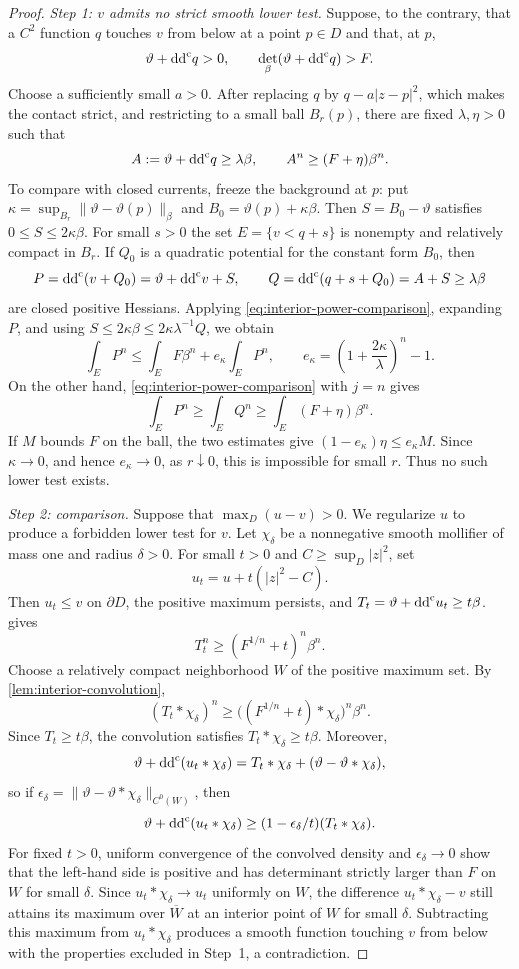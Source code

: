 \begin{proof}
\emph{Step 1: $v$ admits no strict smooth lower test.} Suppose, to the contrary, that a $C^2$ function $q$ touches $v$ from below at a point $p\in D$ and that, at $p$,
\[
  \vartheta+\mathrm{dd}^{\mathrm{c}} q>0,
  \qquad
  \det_\beta(\vartheta+\mathrm{dd}^{\mathrm{c}} q)>F.
\]
Choose a sufficiently small $a>0$. After replacing $q$ by $q-a|z-p|^2$, which makes the contact strict, and restricting to a small ball $B_r(p)$, there are fixed $\lambda,\eta>0$ such that
\[
  A:=\vartheta+\mathrm{dd}^{\mathrm{c}} q\geq\lambda\beta,
  \qquad A^n\geq(F+\eta)\beta^n.
\]
To compare with closed currents, freeze the background at $p$: put $\kappa=\sup_{B_r}\lVert\vartheta-\vartheta(p)\rVert_\beta$ and $B_0=\vartheta(p)+\kappa\beta$. Then $S=B_0-\vartheta$ satisfies $0\leq S\leq2\kappa\beta$. For small $s>0$ the set $E=\{v<q+s\}$ is nonempty and relatively compact in $B_r$. If $Q_0$ is a quadratic potential for the constant form $B_0$, then
\[
  P=\mathrm{dd}^{\mathrm{c}}(v+Q_0)=\vartheta+\mathrm{dd}^{\mathrm{c}} v+S,
  \qquad
  Q=\mathrm{dd}^{\mathrm{c}}(q+s+Q_0)=A+S\geq\lambda\beta
\]
are closed positive Hessians. Applying \eqref{eq:interior-power-comparison}, expanding $P$, and using $S\leq2\kappa\beta\leq2\kappa\lambda^{-1}Q$, we obtain
\[
  \int_E P^n\leq\int_E F\beta^n+e_\kappa\int_E P^n,
  \qquad
  e_\kappa=\left(1+\frac{2\kappa}{\lambda}\right)^n-1.
\]
On the other hand, \eqref{eq:interior-power-comparison} with $j=n$ gives
\[
  \int_E P^n\geq\int_E Q^n\geq\int_E(F+\eta)\beta^n.
\]
If $M$ bounds $F$ on the ball, the two estimates give $(1-e_\kappa)\eta\leq e_\kappa M$. Since $\kappa\to0$, and hence $e_\kappa\to0$, as $r\downarrow0$, this is impossible for small $r$. Thus no such lower test exists.

\emph{Step 2: comparison.} Suppose that $\max_D(u-v)>0$. We regularize $u$ to produce a forbidden lower test for $v$. Let $\chi_\delta$ be a nonnegative smooth mollifier of mass one and radius $\delta>0$. For small $t>0$ and $C\geq\sup_D|z|^2$, set
\[
  u_t=u+t(|z|^2-C).
\]
Then $u_t\leq v$ on $\partial D$, the positive maximum persists, and $T_t=\vartheta+\mathrm{dd}^{\mathrm{c}} u_t\geq t\beta$.  gives
\[
  T_t^n\geq(F^{1/n}+t)^n\beta^n.
\]
Choose a relatively compact neighborhood $W$ of the positive maximum set. By \cref{lem:interior-convolution},
\[
  (T_t*\chi_\delta)^n
  \geq\bigl((F^{1/n}+t)*\chi_\delta\bigr)^n\beta^n.
\]
Since $T_t\geq t\beta$, the convolution satisfies $T_t*\chi_\delta\geq t\beta$. Moreover,
\[
  \vartheta+\mathrm{dd}^{\mathrm{c}}(u_t*\chi_\delta)
  =T_t*\chi_\delta+(\vartheta-\vartheta*\chi_\delta),
\]
so if
$\epsilon_\delta=\|\vartheta-\vartheta*\chi_\delta\|_{C^0(W)}$, then
\[
 \vartheta+\mathrm{dd}^{\mathrm{c}}(u_t*\chi_\delta)
 \geq(1-\epsilon_\delta/t)(T_t*\chi_\delta).
\]
For fixed $t>0$, uniform convergence of the convolved density and
$\epsilon_\delta\to0$ show that the left-hand side is positive and has
determinant strictly larger than $F$ on $W$ for small $\delta$. Since $u_t*\chi_\delta\to u_t$ uniformly on $W$, the difference $u_t*\chi_\delta-v$ still attains its maximum over $\overline W$ at an interior point of $W$ for small $\delta$. Subtracting this maximum from $u_t*\chi_\delta$ produces a smooth function touching $v$ from below with the properties excluded in Step~1, a contradiction.
\end{proof}


